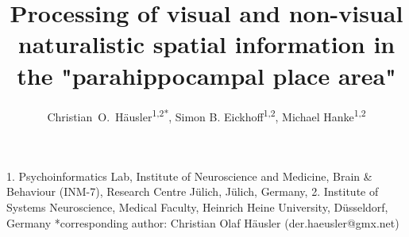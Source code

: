 \documentclass[english]{article}
\begin{document}




\title{Processing of visual and non-visual naturalistic spatial information in
  the "parahippocampal place area"}

\author{
    Christian~O.~Häusler\textsuperscript{1,2{*}},
    Simon B. Eickhoff\textsuperscript{1,2},
    Michael Hanke\textsuperscript{1,2}}

\maketitle
\thispagestyle{fancy}

1. Psychoinformatics Lab, Institute of Neuroscience and Medicine, Brain \&
Behaviour (INM-7), Research Centre Jülich, Jülich, Germany, 2. Institute of
Systems Neuroscience, Medical Faculty, Heinrich Heine University,  Düsseldorf,
Germany {*}corresponding author: Christian Olaf Häusler (der.haeusler@gmx.net)
\end{document}
